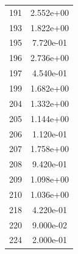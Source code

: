 \documentclass[12pt]{article}
\begin{document}
\begin{longtable}{@{}cc@{}}
191 & 2.552e+00 \\
193 & 1.822e+00 \\
195 & 7.720e-01 \\
196 & 2.736e+00 \\
197 & 4.540e-01 \\
199 & 1.682e+00 \\
204 & 1.332e+00 \\
205 & 1.144e+00 \\
206 & 1.120e-01 \\
207 & 1.758e+00 \\
208 & 9.420e-01 \\
209 & 1.098e+00 \\
210 & 1.036e+00 \\
218 & 4.220e-01 \\
220 & 9.000e-02 \\
224 & 2.000e-01 \\

\bottomrule
\end{longtable}
\end{document}
